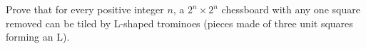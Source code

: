 Prove that for every positive integer $n$, a $2^n\times2^n$ chessboard with any one square removed can be tiled by L-shaped trominoes (pieces made of three unit squares forming an L).
